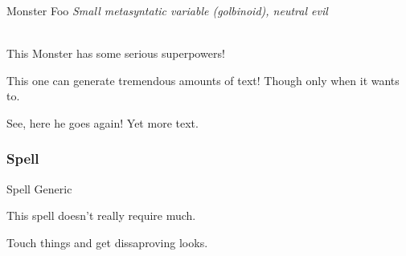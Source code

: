 \documentclass[10pt,twoside,onecolumn]{article}
\begin{document}
\begin{monsterbox}{Monster Foo}
    \textit{Small metasyntatic variable (golbinoid), neutral evil}\\
    \hline
    \basics[%
    armorclass = 12,
    hitpoints  = 16 (3d8 + 3),
    speed      = 50 ft
    ]
    \hline
    \stats[
    STR = 12 (+1),
    DEX = 14 (+2)
    ]
    \hline
    \details[%
    languages = {Common Lisp, Erlang},
    ]
    \hline \\[1mm]
    \begin{monsteraction}
        This Monster has some serious superpowers!
    \end{monsteraction}
    \begin{monsteraction}
        This one can generate tremendous amounts of text! Though only when it wants to.
    \end{monsteraction}

    \begin{monsteraction}
    See, here he goes again! Yet more text.
    \end{monsteraction}
\end{monsterbox}

\subsubsection{Spell}

\begin{spellbox}{Spell Generic}
    \spelldetails[]
    \begin{spellaction}[Materials]
    This spell doesn't really require much.
    \end{spellaction}

    \begin{spellaction}[Effect]
    Touch things and get dissaproving looks.
    \end{spellaction}
\end{spellbox}

\end{document}
